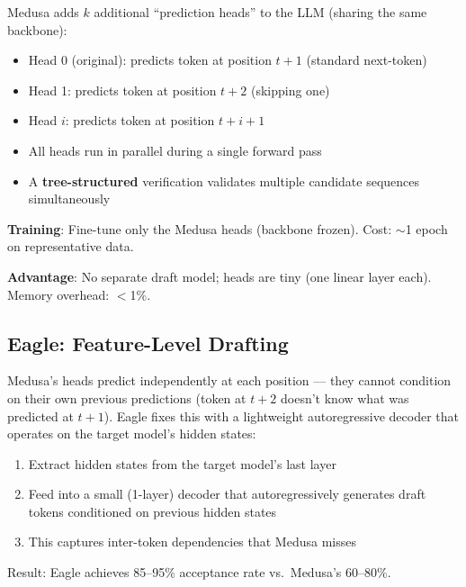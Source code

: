 \begin{keybox}
Medusa adds $k$ additional ``prediction heads'' to the LLM (sharing the same backbone):

\begin{itemize}
  \item Head 0 (original): predicts token at position $t+1$ (standard next-token)
  \item Head 1: predicts token at position $t+2$ (skipping one)
  \item Head $i$: predicts token at position $t+i+1$
  \item All heads run in parallel during a single forward pass
  \item A \textbf{tree-structured} verification validates multiple candidate sequences simultaneously
\end{itemize}

\textbf{Training}: Fine-tune only the Medusa heads (backbone frozen). Cost: $\sim$1 epoch on representative data.

\textbf{Advantage}: No separate draft model; heads are tiny (one linear layer each). Memory overhead: $<$1\%.
\end{keybox}

\subsection{Eagle: Feature-Level Drafting}
\label{eagle-feature-level-drafting}

\begin{intuitionbox}
Medusa’s heads predict independently at each position --- they cannot condition on their own previous predictions (token at $t+2$ doesn’t know what was predicted at $t+1$). Eagle fixes this with a lightweight autoregressive decoder that operates on the target model’s hidden states:

\begin{enumerate}
  \item Extract hidden states from the target model’s last layer
  \item Feed into a small (1-layer) decoder that autoregressively generates draft tokens conditioned on previous hidden states
  \item This captures inter-token dependencies that Medusa misses
\end{enumerate}

Result: Eagle achieves 85--95\% acceptance rate vs.~Medusa’s 60--80\%.
\end{intuitionbox}

